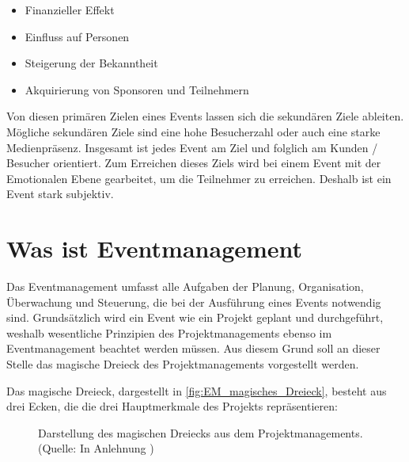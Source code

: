 \begin{itemize}
    \item Finanzieller Effekt
    \item Einfluss auf Personen
    \item Steigerung der Bekanntheit
    \item Akquirierung von Sponsoren und Teilnehmern
\end{itemize}

Von diesen primären Zielen eines Events lassen sich die sekundären Ziele ableiten. Mögliche sekundären Ziele sind eine hohe Besucherzahl oder auch eine starke Medienpräsenz. Insgesamt ist jedes Event am Ziel und folglich am Kunden / Besucher orientiert. Zum Erreichen dieses Ziels wird bei einem Event mit der Emotionalen Ebene gearbeitet, um die Teilnehmer zu erreichen. Deshalb ist ein Event stark subjektiv.\autocite[Vgl.][S. 6 ff.]{Holzbaur.2002}

\section{Was ist Eventmanagement}
Das Eventmanagement umfasst alle Aufgaben der Planung, Organisation, Überwachung und Steuerung, die bei der Ausführung eines Events notwendig sind. Grundsätzlich wird ein Event wie ein Projekt geplant und durchgeführt, weshalb wesentliche Prinzipien des Projektmanagements ebenso im Eventmanagement beachtet werden müssen. Aus diesem Grund soll an dieser Stelle das magische Dreieck des Projektmanagements vorgestellt werden.\autocite[Vgl.][S. 22]{Holzbaur.2002}

Das magische Dreieck, dargestellt in \autoref{fig:EM_magisches_Dreieck}, besteht aus drei Ecken, die die drei Hauptmerkmale des Projekts repräsentieren:

\begin{figure}[H]
    \centering
    \setlength{\fboxsep}{10pt}
    \setlength{\fboxrule}{0.5pt}
    \caption[Eventmanagement: magisches Dreieck]{Darstellung des magischen Dreiecks aus dem Projektmanagements. (Quelle: In Anlehnung \autocite[]{Holzbaur.2002})} \label{fig:EM_magisches_Dreieck}
\end{figure}

